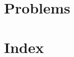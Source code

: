\documentclass[11pt,notitlepage]{scrreprt}
\subtitle{Problems proposals packet}
\begin{document}


\chapter{Problems}


\chapter*{Index}

\end{document}
